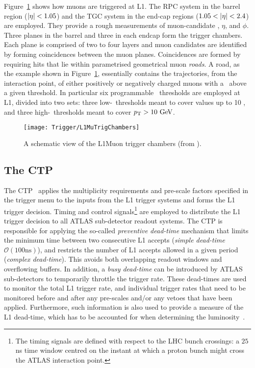 			Figure~\ref{fig:L1MuTrig} shows how muons are triggered at \ac{L1}. The \ac{RPC} system in the barrel region ($|\eta| < 1.05$) and the \ac{TGC} system in the end-cap regions ($1.05 < |\eta| < 2.4$) are employed. They provide a rough measurements of muon-candidate \pt, $\eta$, and $\phi$. Three planes in the barrel and three in each endcap form the trigger chambers. Each plane is comprised of two to four layers and muon candidates are identified by forming coincidences between the muon planes. Coincidences are formed by requiring hits that lie within parametrised geometrical muon \emph{roads}. A road, as the example shown in Figure~\ref{fig:L1MuTrig}, essentially contains the trajectories, from the interaction point, of either positively or negatively charged muons with a \pt\ above a given threshold. In particular six programmable \pt\ thresholds are employed at \ac{L1}, divided into two sets: three low-\pt\ thresholds meant to cover values up to 10 \GeV, and three high-\pt\ thresholds meant to cover $\pt > 10 \GeV$.

			\begin{figure}[!htb]
				\centering
				\texttt{[image: Trigger/L1MuTrigChambers]}
				\caption{\label{fig:L1MuTrig} A schematic view of the \ac{L1Muon} trigger chambers (from \cite{ATLASTrigger2010}).}
			\end{figure}


		\subsection*{The CTP}

			The \ac{CTP}~\cite{ATLASJINST} applies the multiplicity requirements and pre-scale factors specified in the trigger menu to the inputs from the \ac{L1} trigger systems and forms the \ac{L1} trigger decision. Timing and control signals\footnote{The timing signals are defined with respect to the \ac{LHC} bunch crossings: a $25$ ns time window centred on the instant at which a proton bunch might cross the \ac{ATLAS} interaction point.} are employed to distribute the \ac{L1} trigger decision to all \ac{ATLAS} sub-detector readout systems. The \ac{CTP} is responsible for applying the so-called \emph{preventive dead-time} mechanism that limits the minimum time between two consecutive \ac{L1} accepts (\emph{simple dead-time} $\mathcal{O}(100 \mathrm{ns})$), and restricts the number of L1 accepts allowed in a given period (\emph{complex dead-time}). This avoids both overlapping readout windows and overflowing buffers. In addition, a \emph{busy dead-time} can be introduced by \ac{ATLAS} sub-detectors to temporarily throttle the trigger rate. These dead-times are used to monitor the total \ac{L1} trigger rate, and individual trigger rates that need to be monitored before and after any pre-scales and/or any vetoes that have been applied. Furthermore, such information is also used to provide a measure of the \ac{L1} dead-time, which has to be accounted for when determining the luminosity~\cite{ATLASTrigger2010}.

